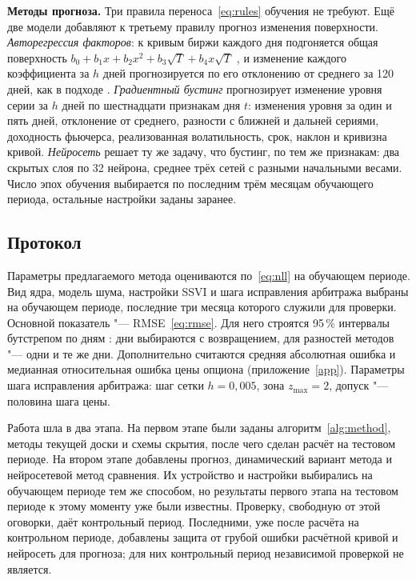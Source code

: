 \documentclass{article}
\begin{document}
\textbf{Методы прогноза.} Три правила переноса~\eqref{eq:rules} обучения не требуют. Ещё две модели добавляют к третьему правилу прогноз изменения поверхности. \emph{Авторегрессия факторов}: к кривым биржи каждого дня подгоняется общая поверхность $b_0+b_1x+b_2x^2+b_3\sqrt{T}+b_4x\sqrt{T}$ \citep{dumas1998implied}, и изменение каждого коэффициента за $h$ дней прогнозируется по его отклонению от среднего за 120 дней, как в подходе \citet{goncalves2006predictable}. \emph{Градиентный бустинг} \citep{friedman2001greedy} прогнозирует изменение уровня серии за $h$ дней по шестнадцати признакам дня $t$: изменения уровня за один и пять дней, отклонение от среднего, разности с ближней и дальней сериями, доходность фьючерса, реализованная волатильность, срок, наклон и кривизна кривой. \emph{Нейросеть} решает ту же задачу, что бустинг, по тем же признакам: два скрытых слоя по 32 нейрона, среднее трёх сетей с разными начальными весами. Число эпох обучения выбирается по последним трём месяцам обучающего периода, остальные настройки заданы заранее.

\subsection{Протокол}

Параметры предлагаемого метода оцениваются по~\eqref{eq:nll} на обучающем периоде. Вид ядра, модель шума, настройки SSVI и шага исправления арбитража выбраны на обучающем периоде, последние три месяца которого служили для проверки. Основной показатель "--- RMSE~\eqref{eq:rmse}. Для него строятся 95\,\% интервалы бутстрепом по дням \citep{efron1993bootstrap}: дни выбираются с возвращением, для разностей методов "--- одни и те же дни. Дополнительно считаются средняя абсолютная ошибка и медианная относительная ошибка цены опциона (приложение~\ref{app}). Параметры шага исправления арбитража: шаг сетки $h=0{,}005$, зона $z_{\max}=2$, допуск "--- половина шага цены.

Работа шла в два этапа. На первом этапе были заданы алгоритм~\ref{alg:method}, методы текущей доски и схемы скрытия, после чего сделан расчёт на тестовом периоде. На втором этапе добавлены прогноз, динамический вариант метода и нейросетевой метод сравнения. Их устройство и настройки выбирались на обучающем периоде тем же способом, но результаты первого этапа на тестовом периоде к этому моменту уже были известны. Проверку, свободную от этой оговорки, даёт контрольный период. Последними, уже после расчёта на контрольном периоде, добавлены защита от грубой ошибки расчётной кривой и нейросеть для прогноза; для них контрольный период независимой проверкой не является.
\end{document}
